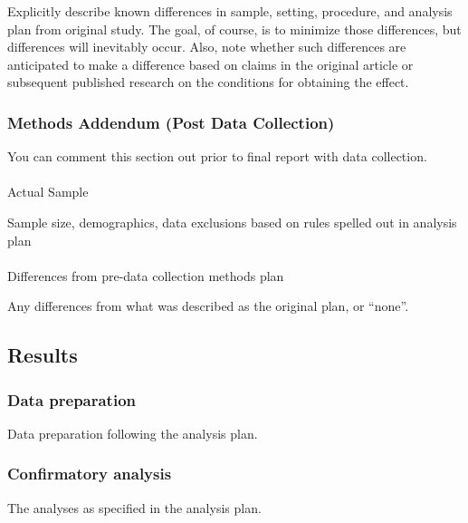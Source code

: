 \documentclass[
  letterpaper,
  DIV=11,
  numbers=noendperiod]{scrartcl}
\makeatletter
\let\oldparagraph\paragraph
\renewcommand{\paragraph}{
    \@ifstar
      \xxxParagraphStar
      \xxxParagraphNoStar
  }
\newcommand{\xxxParagraphStar}[1]{\oldparagraph*{#1}\mbox{}}
\newcommand{\xxxParagraphNoStar}[1]{\oldparagraph{#1}\mbox{}}
\makeatother
\begin{document}
Explicitly describe known differences in sample, setting, procedure, and
analysis plan from original study. The goal, of course, is to minimize
those differences, but differences will inevitably occur. Also, note
whether such differences are anticipated to make a difference based on
claims in the original article or subsequent published research on the
conditions for obtaining the effect.

\subsubsection{Methods Addendum (Post Data
Collection)}\label{methods-addendum-post-data-collection}

You can comment this section out prior to final report with data
collection.

\paragraph{Actual Sample}\label{actual-sample}

Sample size, demographics, data exclusions based on rules spelled out in
analysis plan

\paragraph{Differences from pre-data collection methods
plan}\label{differences-from-pre-data-collection-methods-plan}

Any differences from what was described as the original plan, or
``none''.

\subsection{Results}\label{results}

\subsubsection{Data preparation}\label{data-preparation}

Data preparation following the analysis plan.

\subsubsection{Confirmatory analysis}\label{confirmatory-analysis}

The analyses as specified in the analysis plan.
\end{document}

